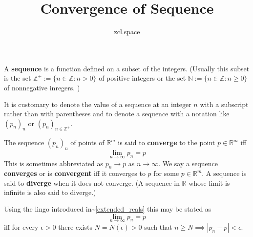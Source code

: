 \documentclass[10pt,a4paper,UTF8]{article}
\author{zcl.space}
\date{}
\title{Convergence of Sequence}
\begin{document}
\maketitle
\tableofcontents
{}
 A \textbf{sequence} is a function defined on a subset of the
integers. (Usually this subset is the set
\(\mathbb{Z}^+:=\{n\in\mathbb{Z}:n > 0\}\) of positive integers or the set \(\mathbb{N}:=\{n\in\mathbb{Z}:n\ge 0\}\) of nonnegative inregers. )

It is customary to denote the value of a sequence at an integer \(n\)
with a subscript rather than with parentheses and to denote a sequence
with a notation like \((p_n)_n\) or \((p_n)_{n\in\mathbb{Z}^+}\).


\begin{definition}
The sequence \((p_n)_n\) of points of \(\mathbb{R}^m\) is said
to \textbf{converge} to the point \(p\in\mathbb{R}^m\)
iff
\begin{equation*}
   \lim_{n\to\infty} p_n=p
\end{equation*}
This is sometimes abbreviated as  \(p_n\to p\) as \(n\to\infty\).
We say a sequence \textbf{converges} or is \textbf{convergent}
iff it converges to \(p\) for some \(p\in\mathbb{R}^m\).
A sequence is said to \textbf{diverge}  when it does not converge.
(A sequence in \(\mathbb{R}\) whose limit is infinite is also said to diverge.)
\end{definition}

\begin{remark}
 Using the lingo introduced in\textasciitilde{}\ref{extended_reals} this may be stated as
$$
   \lim_{n\to\infty} p_n=p
$$
iff for every \(\epsilon > 0\)   there exists \(N=N(\epsilon) > 0\) such that
\(n\ge N\implies |p_n-p| < \epsilon\).
\end{remark}
\end{document}
